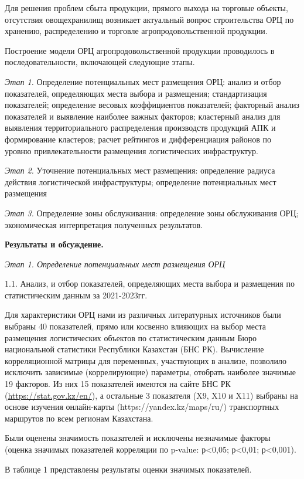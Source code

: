 \begin{multicols}{2}
Для решения проблем сбыта продукции, прямого выхода на торговые объекты,
отсутствия овощехранилищ возникает актуальный вопрос строительства ОРЦ
по хранению, распределению и торговле агропродовольственной продукции.~

Построение модели ОРЦ агропродовольственной продукции проводилось в
последовательности, включающей следующие этапы.

\emph{Этап 1.} Определение потенциальных мест размещения ОРЦ: анализ и
отбор показателей, определяющих места выбора и размещения;
стандартизация показателей; определение весовых коэффициентов
показателей; факторный анализ показателей и выявление наиболее важных
факторов; кластерный анализ для выявления территориального распределения
производств продукций АПК и формирование кластеров; расчет рейтингов и
дифференциация районов по уровню привлекательности размещения
логистических инфраструктур.

\emph{Этап 2.} Уточнение потенциальных мест размещения: определение
радиуса действия логистической инфраструктуры; определение потенциальных
мест размещения

\emph{Этап 3.} Определение зоны обслуживания: определение зоны
обслуживания ОРЦ; экономическая интерпретация полученных результатов.

{\bfseries Результаты и обсуждение.}

\emph{Этап 1. Определение потенциальных мест размещения ОРЦ}

1.1. Анализ, и отбор показателей, определяющих места выбора и размещения
по статистическим данным за 2021-2023гг.

Для характеристики ОРЦ нами из различных литературных источников были
выбраны 40 показателей, прямо или косвенно влияющих на выбор места
размещения логистических объектов по статистическим данным Бюро
национальной статистики Республики Казахстан (БНС РК). Вычисление
корреляционной матрицы для переменных, участвующих в анализе, позволило
исключить зависимые (коррелирующие) параметры, отобрать наиболее
значимые 19 факторов. Из них 15 показателей имеются на сайте БНС РК
(\href{https://stat.gov.kz/en/}{https://stat.gov.kz/en/}), а
остальные 3 показателя (X9, X10 и X11) выбраны на основе изучения
онлайн-карты (https://yandex.kz/maps/ru/) транспортных маршрутов по всем
регионам Казахстана.

Были оценены значимость показателей и исключены незначимые факторы
(оценка значимых показателей корреляции по p-value: р\textless0,05;
р\textless0,01; р\textless0,001).

В таблице 1 представлены результаты оценки значимых показателей.
\end{multicols}
